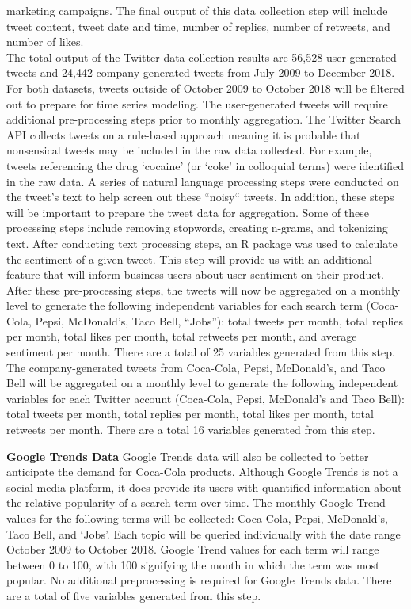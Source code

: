 \documentclass[12pt,oneside]{chicagocapstone}
\begin{document}
marketing campaigns. The final output of this data collection step will
include tweet content, tweet date and time, number of replies, number of
retweets, and number of likes.\\
The total output of the Twitter data collection results are 56,528
user-generated tweets and 24,442 company-generated tweets from July 2009
to December 2018. For both datasets, tweets outside of October 2009 to
October 2018 will be filtered out to prepare for time series modeling.
The user-generated tweets will require additional pre-processing steps
prior to monthly aggregation. The Twitter Search API collects tweets on
a rule-based approach meaning it is probable that nonsensical tweets may
be included in the raw data collected. For example, tweets referencing
the drug `cocaine' (or `coke' in colloquial terms) were identified in
the raw data. A series of natural language processing steps were
conducted on the tweet's text to help screen out these ``noisy`` tweets.
In addition, these steps will be important to prepare the tweet data for
aggregation. Some of these processing steps include removing stopwords,
creating n-grams, and tokenizing text. After conducting text processing
steps, an R package was used to calculate the sentiment of a given
tweet. This step will provide us with an additional feature that will
inform business users about user sentiment on their product. After these
pre-processing steps, the tweets will now be aggregated on a monthly
level to generate the following independent variables for each search
term (Coca-Cola, Pepsi, McDonald's, Taco Bell, ``Jobs''): total tweets
per month, total replies per month, total likes per month, total
retweets per month, and average sentiment per month. There are a total
of 25 variables generated from this step. The company-generated tweets
from Coca-Cola, Pepsi, McDonald's, and Taco Bell will be aggregated on a
monthly level to generate the following independent variables for each
Twitter account (Coca-Cola, Pepsi, McDonald's and Taco Bell): total
tweets per month, total replies per month, total likes per month, total
retweets per month. There are a total 16 variables generated from this
step.

\textbf{Google Trends Data} Google Trends data will also be collected to
better anticipate the demand for Coca-Cola products. Although Google
Trends is not a social media platform, it does provide its users with
quantified information about the relative popularity of a search term
over time. The monthly Google Trend values for the following terms will
be collected: Coca-Cola, Pepsi, McDonald's, Taco Bell, and `Jobs'. Each
topic will be queried individually with the date range October 2009 to
October 2018. Google Trend values for each term will range between 0 to
100, with 100 signifying the month in which the term was most popular.
No additional preprocessing is required for Google Trends data. There
are a total of five variables generated from this step.
\end{document}
